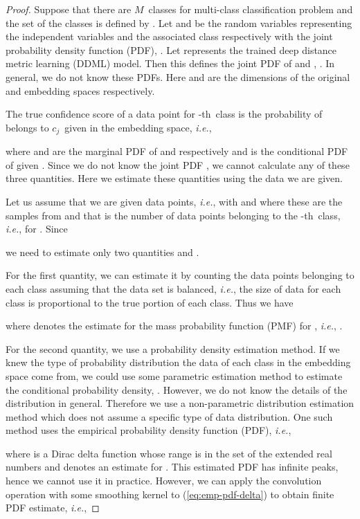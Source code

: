 \documentclass{article}
\newcommand{\class}[1]{\ensuremath{c_{#1}}}
\newcommand{\numclasses}{\ensuremath{{M}}}
\newcommand{\ie}{{\it i.e.}}
\newcommand{\ordinal}[1]{-th}
\begin{document}
\begin{proof}
Suppose that there are \numclasses\ classes for multi-class classification problem
and the set of the classes is defined by .
Let  and  be
the random variables representing the independent variables and the associated class respectively
with the joint probability density function (PDF), .
Let  represents the trained deep distance metric learning (DDML) model.
Then this defines the joint PDF of  and , .
In general, we do not know these PDFs.
Here  and  are the dimensions of the original and embedding spaces respectively.

The true confidence score of a data point  for \ordinal{i}\ class
is
the probability of  belongs to \class{j}\ given  in the embedding space,
\ie,

where  and 
are the marginal PDF of  and  respectively
and 
is the conditional PDF of  given .
Since we do not know the joint PDF ,
we cannot calculate any of these three quantities.
Here we estimate these quantities using the data we are given.

Let us assume that we are given  data points,
\ie,  with  and 
where these are the samples from 
and that  is the number of data points belonging to the \ordinal{j}\ class,
\ie,
 for .
Since

we need to estimate only two quantities  and .

For the first quantity, we can estimate it by counting the data points belonging to each class
assuming that the data set is balanced,
\ie, the size of data for each class is proportional to the true portion of each class.
Thus we have

where  denotes the estimate for the mass probability function (PMF) for ,
\ie, .



For the second quantity,
we use a probability density estimation method.
If we knew the type of probability distribution the data of each class in the embedding space come from,
we could use some parametric estimation method
to estimate the conditional probability density, .
However, we do not know the details of the distribution in general.
Therefore we use a non-parametric distribution estimation method
which does not assume a specific type of data distribution.
One such method uses the empirical probability density function (PDF),
\ie,

where  is a Dirac delta function
whose range is in the set of the extended real numbers
and  denotes an estimate for .
This estimated PDF has infinite peaks, hence we cannot use it in practice.
However, we can apply the convolution operation with some smoothing kernel to (\ref{eq:emp-pdf-delta})
to obtain finite PDF estimate,
\ie,


\end{proof}
\end{document}
